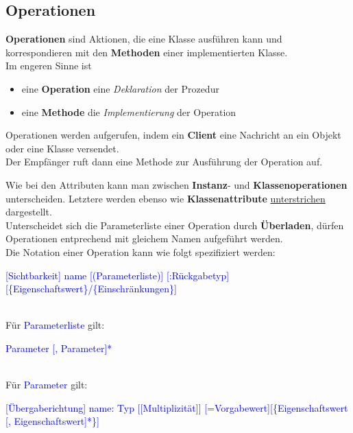 \subsection{Operationen}

\textbf{Operationen} sind Aktionen, die eine Klasse ausführen kann und korrespondieren mit den \textbf{Methoden} einer implementierten Klasse.\\

\noindent
Im engeren Sinne ist
\begin{itemize}
    \item eine \textbf{Operation} eine \textit{Deklaration} der Prozedur
    \item eine \textbf{Methode} die \textit{Implementierung} der Operation
\end{itemize}

\noindent
Operationen werden aufgerufen, indem ein \textbf{Client} eine Nachricht an ein Objekt oder eine Klasse versendet.\\
Der Empfänger ruft dann eine Methode zur Ausführung der Operation auf.

\noindent
Wie bei den Attributen kann man zwischen \textbf{Instanz}- und \textbf{Klassenoperationen} unterscheiden.
Letztere werden ebenso wie \textbf{Klassenattribute} \underline{unterstrichen} dargestellt.\\

\noindent
Unterscheidet sich die Parameterliste einer Operation durch \textbf{Überladen}, dürfen Operationen entprechend mit gleichem Namen aufgeführt werden.\\

\noindent
Die Notation einer Operation kann wie folgt spezifiziert werden:

\medskip
\noindent
\begin{small}
    \textcolor{blue}{[Sichtbarkeit] name [(Parameterliste)] [:Rückgabetyp][\{Eigenschaftswert\}/\{Einschränkungen\}]}
\end{small}\\

\noindent
Für \textcolor{blue}{Parameterliste} gilt:\\
\begin{small}
    \textcolor{blue}{Parameter [, Parameter]*}\\
\end{small}\\


\noindent
Für \textcolor{blue}{Parameter} gilt:\\
\medskip
\noindent
\begin{small}
    \textcolor{blue}{[Übergaberichtung] name: Typ [[Multiplizität]] [=Vorgabewert][\{Eigenschaftswert [, Eigenschaftswert]*\}]}\\
\end{small}\\

